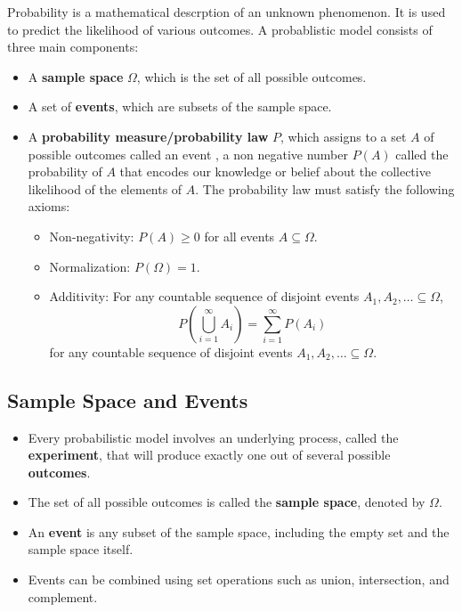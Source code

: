 Probability is a mathematical descrption of an unknown phenomenon. It is used to predict the likelihood of various outcomes. A probablistic model consists of three main components:
\begin{itemize}
    \item A \textbf{sample space} \( \Omega \), which is the set of all possible outcomes.
    \item A set of \textbf{events}, which are subsets of the sample space.
    \item A \textbf{probability measure/probability law} \( P \), which assigns to a set \(A\) of possible outcomes called an event , a non negative number \( P(A) \) called the probability of \(A\) that encodes our knowledge or belief about the collective likelihood of the elements of \(A\). The probability law must satisfy the following axioms:
    \begin{itemize}
        \item Non-negativity: \( P(A) \geq 0 \) for all events \( A \subseteq \Omega \).
        \item Normalization: \( P(\Omega) = 1 \).
        \item Additivity: For any countable sequence of disjoint events \( A_1, A_2, \ldots \subseteq \Omega \),
        \[  
        P\left(\bigcup_{i=1}^{\infty} A_i\right) = \sum_{i=1}^{\infty} P(A_i)
        \]
        for any countable sequence of disjoint events \( A_1, A_2, \ldots \subseteq \Omega \).
    \end{itemize}
\end{itemize}

\subsection{Sample Space and Events}
\begin{itemize}
    \item Every probabilistic model involves an underlying process, called the \textbf{experiment}, that will produce exactly one out of several possible \textbf{outcomes}.
    \item The set of all possible outcomes is called the \textbf{sample space}, denoted by \( \Omega \).
    \item An \textbf{event} is any subset of the sample space, including the empty set and the sample space itself.
    \item Events can be combined using set operations such as union, intersection, and complement.
\end{itemize}


